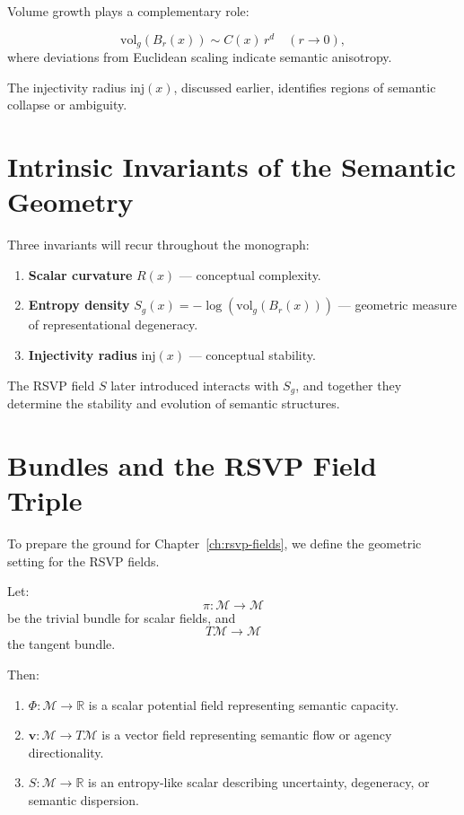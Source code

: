 Volume growth plays a complementary role:

\[
\mathrm{vol}_g(B_r(x)) \sim C(x)\, r^{d} \quad (r\to 0),
\]
where deviations from Euclidean scaling indicate semantic anisotropy.

The injectivity radius $\mathrm{inj}(x)$, discussed earlier, identifies regions of semantic collapse or ambiguity.

\section{Intrinsic Invariants of the Semantic Geometry}

Three invariants will recur throughout the monograph:

\begin{enumerate}
\item \textbf{Scalar curvature} $R(x)$ — conceptual complexity.
\item \textbf{Entropy density} $S_g(x) = - \log(\mathrm{vol}_g(B_r(x)))$ — geometric measure of representational degeneracy.
\item \textbf{Injectivity radius} $\mathrm{inj}(x)$ — conceptual stability.
\end{enumerate}

The RSVP field $S$ later introduced interacts with $S_g$, and together they determine the stability and evolution of semantic structures.

\section{Bundles and the RSVP Field Triple}

To prepare the ground for Chapter~\ref{ch:rsvp-fields}, we define the geometric setting for the RSVP fields.

Let:
\[
\pi : \mathcal{M} \to \mathcal{M}
\]
be the trivial bundle for scalar fields, and
\[
T\mathcal{M} \to \mathcal{M}
\]
the tangent bundle.

Then:

\begin{enumerate}
\item $\Phi : \mathcal{M} \to \mathbb{R}$  
      is a scalar potential field representing semantic capacity.

\item $\mathbf{v} : \mathcal{M} \to T\mathcal{M}$  
      is a vector field representing semantic flow or agency directionality.

\item $S : \mathcal{M} \to \mathbb{R}$  
      is an entropy-like scalar describing uncertainty, degeneracy, or semantic dispersion.
\end{enumerate}

